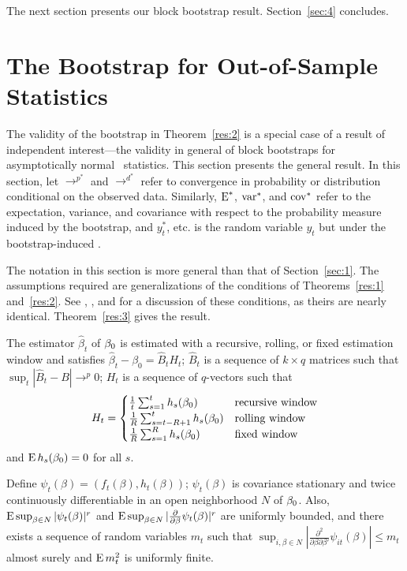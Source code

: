 \documentclass[12pt,fleqn]{article}
\begin{document}
The next section presents our block bootstrap result.
Section~\ref{sec:4} concludes.

\section{The Bootstrap for Out-of-Sample Statistics}\label{sec:1b}
The validity of the bootstrap in Theorem~\ref{res:2} is a special case
of a result of independent interest---the validity in general of block
bootstraps for asymptotically normal \oos\ statistics.  This section
presents the general result.  In this section, let $\to^{p^{*}}$ and
$\to^{d^{*}}$ refer to convergence in probability or distribution
conditional on the observed data.  Similarly, $\operatorname{E}^{*}$, $\operatorname{var}^{*}$,
and $\operatorname{cov}^{*}$ refer to the expectation, variance, and covariance with
respect to the probability measure induced by the bootstrap, and
$y_t^{*}$, etc. is the random variable $y_t$ but under the
bootstrap-induced \cdf.

The notation in this section is more general than that of
Section~\ref{sec:1}.  The assumptions required are generalizations of
the conditions of Theorems~\ref{res:1} and~\ref{res:2}.  See
\citet{Wes:96,Wes:06}, \citet{WeM:98}, and \citet{Mcc:00} for a
discussion of these conditions, as theirs are nearly identical.
Theorem~\ref{res:3} gives the result.

\begin{asmp}\label{a1}
  The estimator $\hat{\beta}_t$ of $\btrue$ is estimated with a
  recursive, rolling, or fixed estimation window and satisfies
  $\hat{\beta}_{t} - \beta_{0} = \hat{B}_{t} H_t$; $\hat{B}_{t}$ is a
  sequence of $k \times q$ matrices such that $\sup_t |\hat{B}_t - B|
  \to^p 0$; $H_{t}$ is a sequence of $q$-vectors such that
  \begin{equation}
    H_{t} = \begin{cases}
      \tfrac1t \sum_{s=1}^t h_{s}(\btrue) & \text{recursive window} \\
      \tfrac1R \sum_{s=t-R+1}^t h_{s}(\btrue) & \text{rolling window} \\
      \tfrac1R \sum_{s=1}^R h_{s}(\btrue) & \text{fixed window} \\
    \end{cases}
  \end{equation}
  and $\E h_{s}(\btrue) = 0$ for all $s$.
\end{asmp}

\begin{asmp}\label{a2}
  Define $\psi_t(\beta) = (f_t(\beta), h_t(\beta))$; $\psi_t(\beta)$
  is covariance stationary and twice continuously differentiable in an
  open neighborhood $N$ of $\btrue$.  Also, $\operatorname{E} \sup_{\beta \in N}
  |\psi_t(\beta)|^r$ and $\operatorname{E}\sup_{\beta \in N}
  |\frac{\partial}{\partial \beta} \psi_t(\beta)|^r$ are uniformly
  bounded, and there exists a sequence of random variables $m_t$ such
  that $\sup_{i,\beta \in N} |\tfrac{\partial^2}{\partial
    \beta \partial \beta'} \psi_{it}(\beta)| \leq m_t$ almost surely
  and $\operatorname{E} m_t^2$ is uniformly finite.
\end{asmp}
\end{document}

